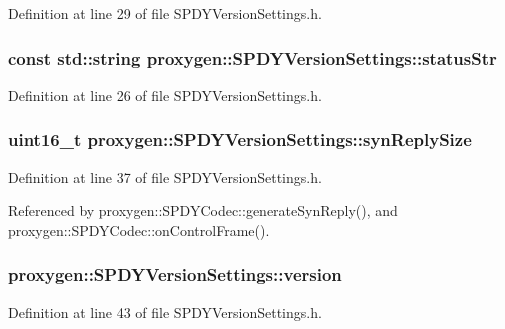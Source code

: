 Definition at line 29 of file S\+P\+D\+Y\+Version\+Settings.\+h.

\subsubsection[{status\+Str}]{\setlength{\rightskip}{0pt plus 5cm}const std\+::string proxygen\+::\+S\+P\+D\+Y\+Version\+Settings\+::status\+Str}\label{structproxygen_1_1SPDYVersionSettings_ae6776fc3887aa959054ce8d79f11e01b}


Definition at line 26 of file S\+P\+D\+Y\+Version\+Settings.\+h.

\subsubsection[{syn\+Reply\+Size}]{\setlength{\rightskip}{0pt plus 5cm}uint16\+\_\+t proxygen\+::\+S\+P\+D\+Y\+Version\+Settings\+::syn\+Reply\+Size}\label{structproxygen_1_1SPDYVersionSettings_a4ad78580445e8afd82e70f13df216967}


Definition at line 37 of file S\+P\+D\+Y\+Version\+Settings.\+h.



Referenced by proxygen\+::\+S\+P\+D\+Y\+Codec\+::generate\+Syn\+Reply(), and proxygen\+::\+S\+P\+D\+Y\+Codec\+::on\+Control\+Frame().

\subsubsection[{version}]{ proxygen\+::\+S\+P\+D\+Y\+Version\+Settings\+::version}\label{structproxygen_1_1SPDYVersionSettings_a875f65c7e068ac0a2699b4f3441c468f}


Definition at line 43 of file S\+P\+D\+Y\+Version\+Settings.\+h.



